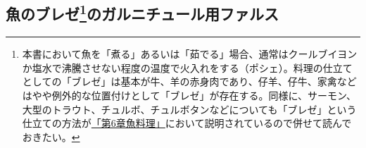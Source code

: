 \hypertarget{farces-speciales-pour-garnir-les-poissons-braises}{%
\subsection[魚のブレゼのガルニチュール用ファルス]{\texorpdfstring{魚のブレゼ\footnote{本書において魚を「煮る」あるいは「茹でる」場合、通常はクールブイヨンか塩水で沸騰させない程度の温度で火入れをする（ポシェ）。料理の仕立てとしての「ブレゼ」は基本が牛、羊の赤身肉であり、仔羊、仔牛、家禽などはやや例外的な位置付けとして「ブレゼ」が存在する。同様に、サーモン、大型のトラウト、チュルボ、チュルボタンなどについても「ブレゼ」という仕立ての方法が\protect\hyperlink{cuisson-des-poissons-par-le-braisage}{「第6章魚料理」}において説明されているので併せて読んでおきたい。}のガルニチュール用ファルス}{魚のブレゼのガルニチュール用ファルス}}\label{farces-speciales-pour-garnir-les-poissons-braises}}


